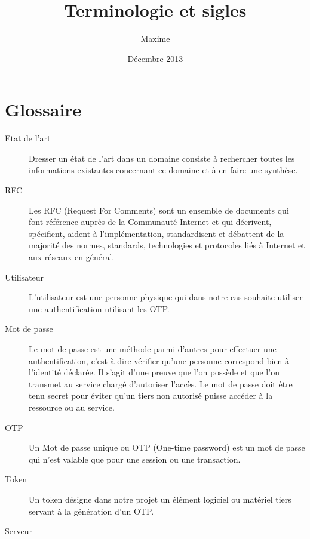 \documentclass{"../../res/univ-projet"}
\title{Terminologie et sigles}
\author{\bsc{Michotte} Maxime}
\date{Décembre 2013}
\begin{document}
\maketitle
\section{Glossaire}
\begin{description}
	\item[Etat de l'art]
  	Dresser un \'{e}tat de l'art dans un domaine consiste à rechercher toutes 
  	les informations existantes concernant ce domaine et à en faire une synthèse.
	\\
	\item[RFC]
  	Les RFC (Request For Comments) sont un ensemble de documents qui font 
  	r\'{e}f\'{e}rence auprès de la Communaut\'{e} Internet et qui d\'{e}crivent, 
  	sp\'{e}cifient, aident à l'impl\'{e}mentation, standardisent et d\'{e}battent de 
  	la majorit\'{e} des normes, standards, technologies et protocoles li\'{e}s à 
  	Internet et aux r\'{e}seaux en g\'{e}n\'{e}ral.
	\\
	\item[Utilisateur]
  	L'utilisateur est une personne physique qui dans notre cas souhaite utiliser 
  	une authentification utilisant les OTP.
	\\
	\item[Mot de passe]
  	Le mot de passe est une m\'{e}thode parmi d'autres pour effectuer une
  	authentification, c'est-à-dire v\'{e}rifier qu'une personne correspond bien à 
  	l'identit\'{e} d\'{e}clar\'{e}e. Il s'agit d'une preuve que l'on possède et que 
  	l'on transmet au service charg\'{e} d'autoriser l'accès. Le mot de passe doit être 
  	tenu secret pour \'{e}viter qu'un tiers non autoris\'{e} puisse acc\'{e}der à 
  	la ressource ou au service.  
  	\\
	\item[OTP]
  	Un Mot de passe unique ou OTP (One-time password) est un mot de passe qui 
  	n'est valable que pour une session ou une transaction.
	\\
	\item[Token]
  	Un token d\'{e}signe dans notre projet un \'{e}l\'{e}ment logiciel ou mat\'{e}riel 
  	tiers servant à la g\'{e}n\'{e}ration d'un OTP.
  	\\
	\item[Serveur]

\end{description}
\end{document}
